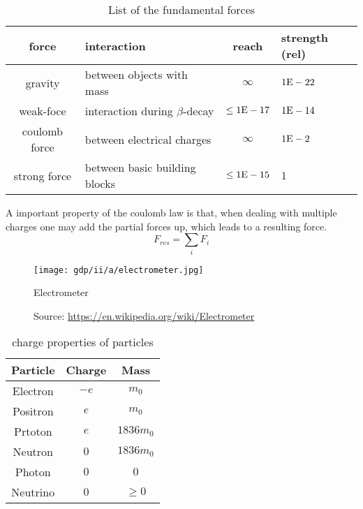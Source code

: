 \begin{table}
    \begin{tabularx}{\textwidth}{|c|l|c|X|}
        \hline
        \textbf{force} & \textbf{interaction} & \textbf{reach} & \textbf{strength (rel)}\\ 
        \hline
        gravity & between objects with mass & $\infty$ & $1\text{E} -22$ \\ 
        weak-foce & interaction during $\beta$-decay & $\leq 1 \text{E} -17$ & $1 \text{E} -14$ \\ 
        coulomb force & between electrical charges & $\infty$ & $1\text{E} -2$ \\ 
        strong force & between basic building blocks & $\leq 1 \text{E} -15$ & $1$\\ 
        \hline
    \end{tabularx}

    \caption{List of the fundamental forces}
    \label{tab:gdp:iia:fund_forces}
\end{table}

\begin{important}
A important property of the coulomb law is that,
    when dealing with multiple charges 
    one may add the partial forces up, 
    which leads to a resulting force.
\begin{equation}
    F_{res} = \sum_i F_i
\end{equation}
\end{important}


\begin{figure}
    \centering
    \texttt{[image: gdp/ii/a/electrometer.jpg]}
    \caption{Electrometer}
    \label{fig:gdp:ii:a:electrometer}
    \caption*{Source: \url{https://en.wikipedia.org/wiki/Electrometer} }
\end{figure}

\begin{table}
    \begin{tabularx}{\textwidth}{c c c}
        Particle & Charge & Mass\\
        \hline
        Electron & $-e$ & $m_0$ \\
        Positron & $e$ & $m_0$ \\
        Prtoton & $e$ & $1836m_0$ \\
        Neutron & $0$ & $1836m_0$ \\
        Photon & $0$ & $0$ \\
        Neutrino & $0$ & $\geq 0$ \\
    \end{tabularx}
    \caption{charge properties of particles}
    \label{tab:gdp:ii:a:parti_cha}
\end{table}





